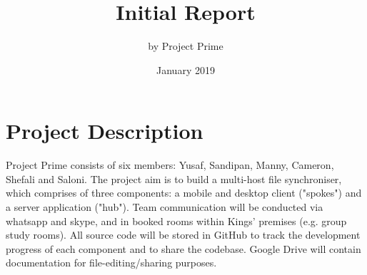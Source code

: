 \documentclass{article}
\title{Initial Report}
\author{by Project Prime}
\date{January 2019}
\begin{document}
\maketitle

\section{Project Description}
Project Prime consists of six members: Yusaf, Sandipan, Manny, Cameron, Shefali and Saloni. The project aim is to build a multi-host file synchroniser, which comprises of three components: a mobile and desktop client ("spokes") and a server application ("hub"). Team communication will be conducted via whatsapp and skype, and in booked rooms within Kings' premises (e.g. group study rooms). All source code will be stored in GitHub to track the development progress of each component and to share the codebase. Google Drive will contain documentation for file-editing/sharing purposes. 
\end{document}
